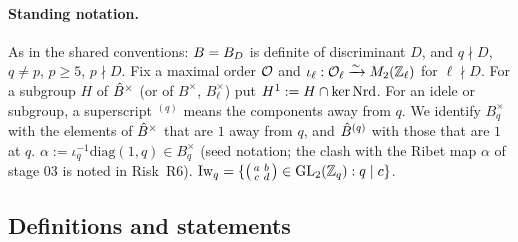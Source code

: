 \paragraph{Standing notation.} As in the shared conventions: $B=B_D$ is definite of discriminant $D$, and
$q\nmid D$, $q\neq p$, $p\ge5$, $p\nmid D$. Fix a maximal order $\mathcal{O}$ and
$\iota_\ell:\mathcal{O}_\ell\xrightarrow{\sim}M_2(\mathbb{Z}_\ell)$ for $\ell\nmid D$. For a subgroup $H$ of $\hat{B}^\times$
(or of $B^\times$, $B_\ell^\times$) put $H^1:=H\cap\ker\mathrm{Nrd}$. For an idele or subgroup, a superscript
${}^{(q)}$ means the components away from $q$. We identify $B_q^\times$ with the elements of $\hat{B}^\times$
that are $1$ away from $q$, and $\hat{B}^{(q)}$ with those that are $1$ at $q$.
$\alpha:=\iota_q^{-1}\mathrm{diag}(1,q)\in B_q^\times$ (seed notation; the clash with the Ribet map $\alpha$ of
stage 03 is noted in Risk~R6).
$\mathrm{Iw}_q=\{\left(\begin{smallmatrix}a&b\\c&d\end{smallmatrix}\right)\in\mathrm{GL}_2(\mathbb{Z}_q):q\mid c\}$.

\subsection{Definitions and statements}

